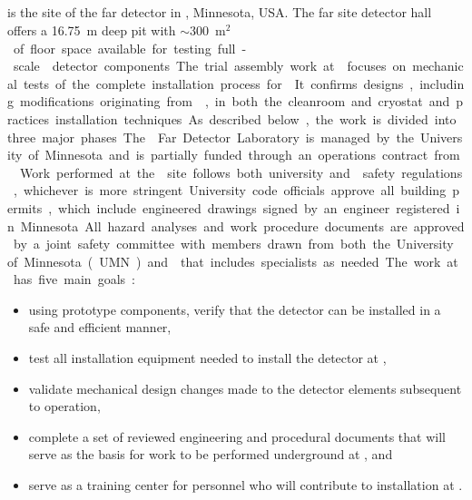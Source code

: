 \subsection{}

 is the site of the  far detector in ,
Minnesota, USA. The  far site detector hall offers a \SI{16.75}{m} 
deep pit with $\sim$\SI{300}{m$^2$} of floor space available for 
testing full-scale  detector components.  The trial assembly 
work at  focuses on mechanical tests of the complete installation
process for . It confirms designs,
including modifications originating from , 
in both the cleanroom and cryostat and practices installation techniques.  As described below, the 
work is divided into three major phases.  The  Far 
Detector Laboratory is managed by the University of Minnesota 
and is partially funded through an operations contract from 
.  Work performed at the  site follows both 
university and  safety regulations, whichever is more 
stringent. University code officials approve all building permits, 
which include engineered drawings signed by an engineer registered 
in Minnesota. All hazard analyses and work procedure documents are 
approved by a joint safety committee with members drawn from both 
the University of Minnesota (UMN) and  that includes specialists 
as needed.

The work at  has five main goals:
\begin{itemize}
  \item using prototype  components, verify that the  detector can be installed 
    in a safe and efficient manner,
    \item test all installation equipment needed to install the  detector at ,
  \item validate mechanical design changes made to the detector
    elements subsequent to  operation,
  \item complete a set of reviewed engineering and procedural documents that will serve 
    as the basis for work to be performed underground at 
    , and 
  \item serve as a training center for personnel who will 
    contribute to   installation at .
\end{itemize}

